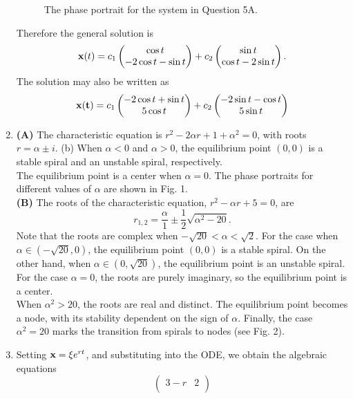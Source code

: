 \documentclass[11pt,a4paper]{article}
\begin{document}
\begin{enumerate}
\begin{figure}[H]
			\caption{The phase portrait for the system in Question 5A.}
		\end{figure}
		Therefore the general solution is
		$$
		\vb{x}(t) = c_1
		\begin{pmatrix}
			\cos t\\
			-2\cos t - \sin t
		\end{pmatrix} + c_2
		\begin{pmatrix}
			\sin t\\
			\cos t -2\sin t
		\end{pmatrix}.
		$$
		The solution may also be written as
		$$
		\vb{x(t)} = c_1
		\begin{pmatrix}
			-2\cos t + \sin t\\
			5\cos t
		\end{pmatrix} + c_2
		\begin{pmatrix}
			-2\sin t - \cos t\\
			5\sin t
		\end{pmatrix}
		$$
		\item \textbf{(A)} The characteristic equation is $r^2 - 2\alpha r + 1 + \alpha^2 = 0$, with roots $r = \alpha \pm i$. (b) When $\alpha < 0$ and $\alpha > 0$, the equilibrium point $(0, 0)$ is a stable spiral and an unstable spiral, respectively.\\
		The equilibrium point is a center when $\alpha = 0$. The phase portraits for different values of $\alpha$ are shown in Fig. 1.\\
		\textbf{(B)} The roots of the characteristic equation, $r^2 - \alpha r + 5 = 0$, are
		$$
		r_{1,2} = \frac{\alpha}{1}\pm \frac{1}{2}\sqrt{\alpha^2 - 20}.
		$$
		Note that the roots are complex when $- \sqrt{20} < \alpha < \sqrt{2}$. For the case when $\alpha \in (-\sqrt{20}, 0)$, the equilibrium point $(0, 0)$ is a stable spiral. On the other hand, when $\alpha \in (0, \sqrt{20})$, the equilibrium point is an unstable spiral.\\
		For the case $\alpha = 0$, the roots are purely imaginary, so the equilibrium point is a center.\\
		When $\alpha^2 > 20$, the roots are real and distinct. The equilibrium point becomes a node, with its stability dependent on the sign of $\alpha$. Finally, the case $\alpha^2 = 20$ marks the transition from spirals to nodes (see Fig. 2).
		\item Setting $\vb{x} = \xi e^{rt}$, and substituting into the ODE, we obtain the algebraic equations
		$$
		\begin{pmatrix}
			3-r & 2\\

\end{pmatrix}$$
\end{enumerate}
\end{document}
